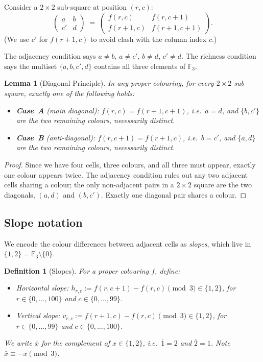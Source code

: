 \documentclass{article}
\newtheorem{lemma}[theorem]{Lemma}
\newtheorem{definition}[theorem]{Definition}
\newcommand{\comp}[1]{\bar{#1}}   %
\begin{document}
Consider a $2\times 2$ sub-square at position $(r,c)$:
\[
  \begin{pmatrix}
    a & b \\ c' & d
  \end{pmatrix}
  \;=\;
  \begin{pmatrix}
    f(r,c)   & f(r,c+1)   \\
    f(r+1,c) & f(r+1,c+1)
  \end{pmatrix}.
\]
(We use $c'$ for $f(r+1,c)$ to avoid clash with the column
index $c$.)

The adjacency condition says $a\neq b$, $a\neq c'$,
$b\neq d$, $c'\neq d$.  The richness condition says the
multiset $\{a,b,c',d\}$ contains all three elements of
$\mathbb{F}_3$.

\begin{lemma}[Diagonal Principle]
\label{lem:diag}
In any proper colouring, for every $2\times 2$ sub-square,
exactly one of the following holds:
\begin{itemize}
  \item \textbf{Case~A} (main diagonal):
    $f(r,c) = f(r+1,c+1)$, i.e.\ $a = d$, and $\{b,c'\}$
    are the two remaining colours, necessarily distinct.
  \item \textbf{Case~B} (anti-diagonal):
    $f(r,c+1) = f(r+1,c)$, i.e.\ $b = c'$, and $\{a,d\}$
    are the two remaining colours, necessarily distinct.
\end{itemize}
\end{lemma}

\begin{proof}
Since we have four cells, three colours, and all three must
appear, exactly one colour appears twice.
The adjacency condition rules out any two adjacent cells
sharing a colour; the only non-adjacent pairs in a $2\times 2$
square are the two diagonals, $(a,d)$ and $(b,c')$.
Exactly one diagonal pair shares a colour.
\end{proof}

\subsection{Slope notation}
\label{subsec:slope}

We encode the colour differences between adjacent cells as
\emph{slopes}, which live in $\{1,2\} = \mathbb{F}_3\setminus\{0\}$.

\begin{definition}[Slopes]
For a proper colouring $f$, define:
\begin{itemize}
  \item \emph{Horizontal slope:}
    $h_{r,c} := f(r,c+1)-f(r,c)\pmod3 \in\{1,2\}$,
    for $r\in\{0,\ldots,100\}$ and $c\in\{0,\ldots,99\}$.
  \item \emph{Vertical slope:}
    $v_{r,c} := f(r+1,c)-f(r,c)\pmod3 \in\{1,2\}$,
    for $r\in\{0,\ldots,99\}$ and $c\in\{0,\ldots,100\}$.
\end{itemize}
We write $\comp{x}$ for the complement of $x\in\{1,2\}$, i.e.\
$\comp{1}=2$ and $\comp{2}=1$.  Note $\comp{x}\equiv -x\pmod3$.
\end{definition}
\end{document}
